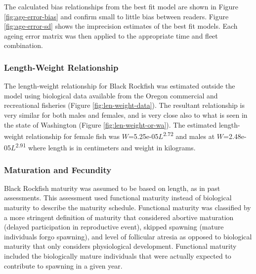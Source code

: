 \documentclass[11pt,
  english,
  letterpaper,
]{article}
\begin{document}
The calculated bias relationships from the best fit model are shown in Figure \ref{fig:age-error-bias} and confirm small to little bias between readers. Figure \ref{fig:age-error-sd} shows the imprecision estimates of the best fit models. Each ageing error matrix was then applied to the appropriate time and fleet combination.

\hypertarget{length-weight-relationship}{%
\subsubsection{Length-Weight Relationship}\label{length-weight-relationship}}

The length-weight relationship for Black Rockfish was estimated outside the model using biological data available from the Oregon commercial and recreational fisheries (Figure \ref{fig:len-weight-data}). The resultant relationship is very similar for both males and females, and is very close also to what is seen in the state of Washington (Figure \ref{fig:len-weight-or-wa}). The estimated length-weight relationship for female fish was \(W\)=5.25e-05\(L\)\textsuperscript{2.72} and males at \(W\)=2.48e-05\(L\)\textsuperscript{2.91} where length is in centimeters and weight in kilograms.

\hypertarget{maturation-and-fecundity}{%
\subsubsection{Maturation and Fecundity}\label{maturation-and-fecundity}}

Black Rockfish maturity was assumed to be based on length, as in past assessments. This assessment used functional maturity instead of biological maturity to describe the maturity schedule. Functional maturity was classified by a more stringent definition of maturity that considered abortive maturation (delayed participation in reproductive event), skipped spawning (mature individuals forgo spawning), and level of follicular atresia as opposed to biological maturity that only considers physiological development. Functional maturity included the biologically mature individuals that were actually expected to contribute to spawning in a given year.
\end{document}
